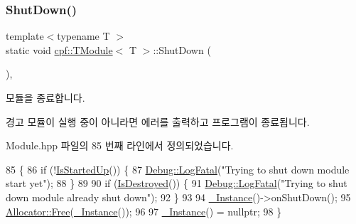 \subsubsection{\texorpdfstring{Shut\+Down()}{ShutDown()}}
{\footnotesize\ttfamily template$<$typename T $>$ \\
static void \hyperlink{classcpf_1_1_t_module}{cpf\+::\+T\+Module}$<$ T $>$\+::Shut\+Down (\begin{DoxyParamCaption}{ }\end{DoxyParamCaption})\hspace{0.3cm}{\ttfamily [inline]}, {\ttfamily [static]}}

모듈을 종료합니다. \begin{DoxyWarning}{경고}
모듈이 실행 중이 아니라면 에러를 출력하고 프로그램이 종료됩니다. 
\end{DoxyWarning}


Module.\+hpp 파일의 85 번째 라인에서 정의되었습니다.


\begin{DoxyCode}
85                                \{
86             \textcolor{keywordflow}{if} (!\hyperlink{classcpf_1_1_t_module_a73732afee7131dad652bf3e00c75cef9}{IsStartedUp}()) \{
87                 \hyperlink{classcpf_1_1_debug_a22849847c74bcb444922c263c9ae6183}{Debug::LogFatal}(\textcolor{stringliteral}{"Trying to shut down module start yet"});
88             \}
89 
90             \textcolor{keywordflow}{if} (\hyperlink{classcpf_1_1_t_module_a9f70f0a70ac59b13b7a874f82c877337}{IsDestroyed}()) \{
91                 \hyperlink{classcpf_1_1_debug_a22849847c74bcb444922c263c9ae6183}{Debug::LogFatal}(\textcolor{stringliteral}{"Trying to shut down module already shut down"});
92             \}
93 
94             \hyperlink{classcpf_1_1_t_module_a06ab8af8ea6b294959937fd2bbc1e615}{\_Instance}()->onShutDown();
95             \hyperlink{classcpf_1_1_allocator_af63eadbfa53045d7eede980fd5d15eb4}{Allocator::Free}(\hyperlink{classcpf_1_1_t_module_a06ab8af8ea6b294959937fd2bbc1e615}{\_Instance}());
96 
97             \hyperlink{classcpf_1_1_t_module_a06ab8af8ea6b294959937fd2bbc1e615}{\_Instance}() = \textcolor{keyword}{nullptr};
98         \}
\end{DoxyCode}
\mbox{\label{classcpf_1_1_t_module_a02fbf3c4d28a3328e81b0e8d0bdd93b0}} 
